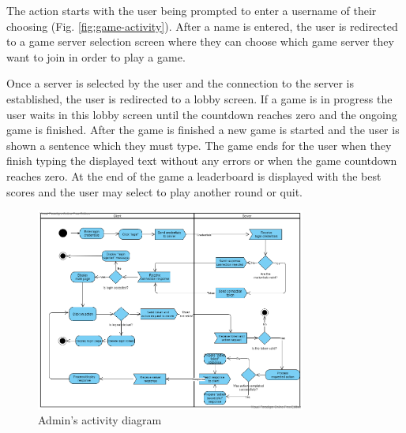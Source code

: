 \documentclass[titlepage]{article}
\newcommand{\figref}[1]{{(Fig. \hypersetup{linkcolor=blue}\ref{#1})}}
\begin{document}
The action starts with the user being prompted to enter a username of their choosing \figref{fig:game-activity}. After a name is entered, the user is redirected to a game server selection screen where they can choose which game server they want to join in order to play a game.

Once a server is selected by the user and the connection to the server is established, the user is redirected to a lobby screen. If a game is in progress the user waits in this lobby screen until the countdown reaches zero and the ongoing game is finished. After the game is finished a new game is started and the user is shown a sentence which they must type. The game ends for the user when they finish typing the displayed text without any errors or when the game countdown reaches zero. At the end of the game a leaderboard is displayed with the best scores and the user may select to play another round or quit.

\begin{figure}[H]
	\centering
	\includegraphics[width=0.79\textwidth]{activity_diagram_admin.png}
	\caption{Admin's activity diagram}
	\label{fig:admin-activity}
\end{figure}
\end{document}
